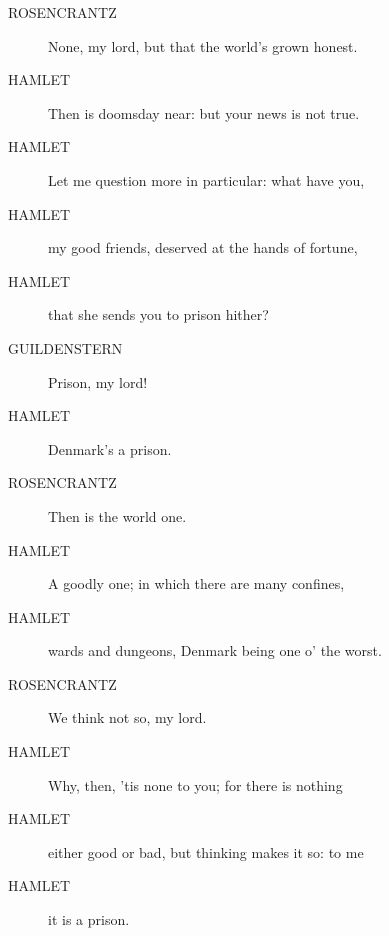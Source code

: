 \documentclass{article}
\begin{document}
\begin{description}
            
\item[ROSENCRANTZ] None, my lord, but that the world's grown honest.
\end{description}
          
\begin{description}
            
\item[HAMLET] Then is doomsday near: but your news is not true.
\item[HAMLET] Let me question more in particular: what have you,
\item[HAMLET] my good friends, deserved at the hands of fortune,
\item[HAMLET] that she sends you to prison hither?
\end{description}
          
\begin{description}
            
\item[GUILDENSTERN] Prison, my lord!
\end{description}
          
\begin{description}
            
\item[HAMLET] Denmark's a prison.
\end{description}
          
\begin{description}
            
\item[ROSENCRANTZ] Then is the world one.
\end{description}
          
\begin{description}
            
\item[HAMLET] A goodly one; in which there are many confines,
\item[HAMLET] wards and dungeons, Denmark being one o' the worst.
\end{description}
          
\begin{description}
            
\item[ROSENCRANTZ] We think not so, my lord.
\end{description}
          
\begin{description}
            
\item[HAMLET] Why, then, 'tis none to you; for there is nothing
\item[HAMLET] either good or bad, but thinking makes it so: to me
\item[HAMLET] it is a prison.
\end{description}
          
\end{document}
